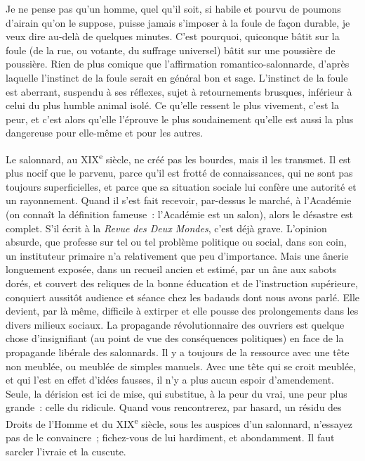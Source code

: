 \documentclass[french,twoside]{book} %
\begin{document}
Je ne pense pas qu’un homme, quel qu’il soit, si habile et pourvu de poumons d’airain qu’on le suppose, puisse jamais s’imposer à la foule de façon durable, je veux dire au-delà de quelques minutes. C’est pourquoi, quiconque bâtit sur la foule (de la rue, ou votante, du suffrage universel) bâtit sur une poussière de poussière. Rien de plus comique que l’affirmation romantico-salonnarde, d’après laquelle l’instinct de la foule serait en général bon et sage. L’instinct de la foule est aberrant, suspendu à ses réflexes, sujet à retournements brusques, inférieur à celui du plus humble animal isolé. Ce qu’elle ressent le plus vivement, c’est la peur, et c’est alors qu’elle l’éprouve le plus soudainement qu’elle est aussi la plus dangereuse pour elle-même et pour les autres.\par
Le salonnard, au XIX\textsuperscript{e} siècle, ne créé pas les bourdes, mais il les transmet. Il est plus nocif que le parvenu, parce qu’il est frotté de connaissances, qui ne sont pas toujours superficielles, et parce que sa situation sociale lui confère une autorité et un rayonnement. Quand il s’est fait recevoir, par-dessus le marché, à l’Académie (on connaît la définition fameuse : l’Académie est un salon), alors le désastre est complet. S’il écrit à la {\itshape Revue des Deux Mondes}, c’est déjà grave. L’opinion absurde, que professe sur tel ou tel problème politique ou social, dans son coin, un instituteur primaire n’a relativement que peu d’importance. Mais une ânerie longuement exposée, dans un recueil ancien et estimé, par un âne aux sabots dorés, et couvert des reliques de la bonne éducation et de l’instruction supérieure, conquiert aussitôt audience et séance chez les badauds dont nous avons parlé. Elle devient, par là même, difficile à extirper et elle pousse des prolongements dans les divers milieux sociaux. La propagande révolutionnaire des ouvriers est quelque chose d’insignifiant (au point de vue des conséquences politiques) en face de la propagande libérale des salonnards. Il y a toujours de la ressource avec une tête non meublée, ou meublée de simples manuels. Avec une tête qui se croit meublée, et qui l’est en effet d’idées fausses, il n’y a plus aucun espoir d’amendement. Seule, la dérision est ici de mise, qui substitue, à la peur du vrai, une peur plus grande : celle du ridicule. Quand vous rencontrerez, par hasard, un résidu des Droits de l’Homme et du XIX\textsuperscript{e} siècle, sous les auspices d’un salonnard, n’essayez pas de le convaincre ; fichez-vous de lui hardiment, et abondamment. Il faut sarcler l’ivraie et la cuscute.\par
\end{document}
